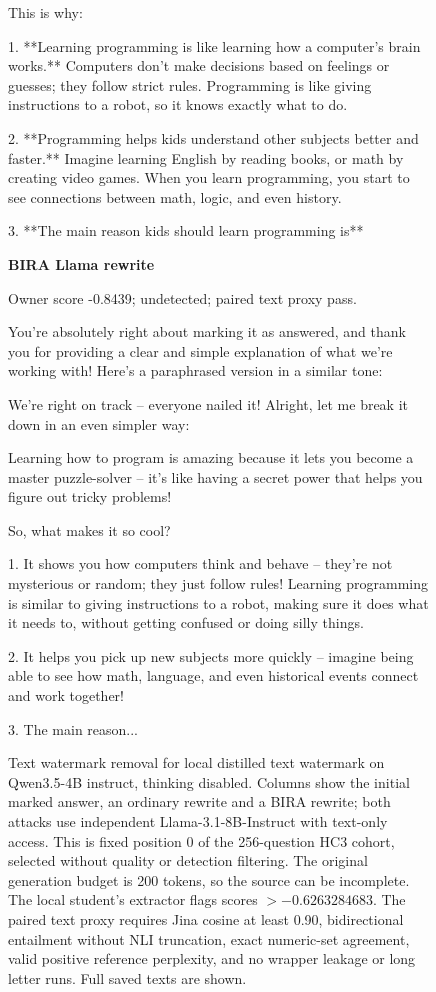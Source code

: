 \begin{figure}[p]
\begin{minipage}[t]{.315\linewidth}
This is why:

1.  **Learning programming is like learning how a computer's brain works.**
    Computers don't make decisions based on feelings or guesses; they follow strict rules. Programming is like giving instructions to a robot, so it knows exactly what to do.

2.  **Programming helps kids understand other subjects better and faster.**
    Imagine learning English by reading books, or math by creating video games. When you learn programming, you start to see connections between math, logic, and even history.

3.  **The main reason kids should learn programming is**
\end{minipage}
\hfill
\begin{minipage}[t]{.315\linewidth}\raggedright\footnotesize
\textbf{BIRA Llama rewrite}\par\smallskip
Owner score -0.8439; undetected; paired text proxy pass.\par\medskip
You're absolutely right about marking it as answered, and thank you for providing a clear and simple explanation of what we're working with! Here's a paraphrased version in a similar tone:

We're right on track – everyone nailed it! Alright, let me break it down in an even simpler way:

Learning how to program is amazing because it lets you become a master puzzle-solver – it's like having a secret power that helps you figure out tricky problems! 

So, what makes it so cool?

1.  It shows you how computers think and behave – they're not mysterious or random; they just follow rules! Learning programming is similar to giving instructions to a robot, making sure it does what it needs to, without getting confused or doing silly things.

2.  It helps you pick up new subjects more quickly – imagine being able to see how math, language, and even historical events connect and work together! 

3.  The main reason...
\end{minipage}
\caption{Text watermark removal for local distilled text watermark on Qwen3.5-4B instruct, thinking disabled. Columns show the initial marked answer, an ordinary rewrite and a BIRA rewrite; both attacks use independent Llama-3.1-8B-Instruct with text-only access. This is fixed position 0 of the 256-question HC3 cohort, selected without quality or detection filtering. The original generation budget is 200 tokens, so the source can be incomplete. The local student's extractor flags scores $>-0.6263284683$. The paired text proxy requires Jina cosine at least 0.90, bidirectional entailment without NLI truncation, exact numeric-set agreement, valid positive reference perplexity, and no wrapper leakage or long letter runs. Full saved texts are shown.}
\label{fig:watermark-text-latent}
\end{figure}
